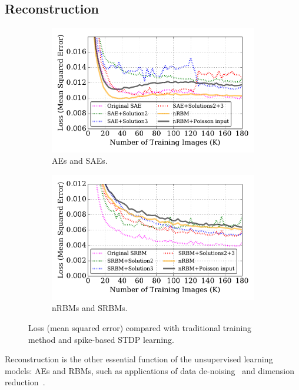 \subsection{Reconstruction}

\begin{figure}
	\centering
	\begin{subfigure}[t]{0.49\textwidth}
		\includegraphics[width=\textwidth]{pics_sdlm/53_MNIST_SRBM_all/compare_recon.pdf}
		\caption{AEs and SAEs.}
	\end{subfigure}
	\begin{subfigure}[t]{0.49\textwidth}
		\includegraphics[width=\textwidth]{pics_sdlm/53_MNIST_SRBM_all/compare_recon_rbm.pdf}
		\caption{nRBMs and SRBMs.}
	\end{subfigure}
	\caption{Loss (mean squared error) compared with traditional training method and spike-based STDP learning.}
\end{figure}

Reconstruction is the other essential function of the unsupervised learning models: AEs and RBMs, such as applications of data de-noising~\cite{xie2012image} and dimension reduction~\cite{hinton2006fast}.


